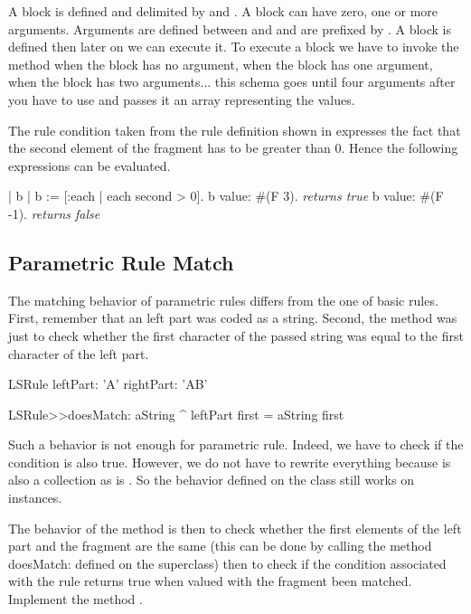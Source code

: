 A block is defined and delimited by \ct{[} and \ct{]}. A block can
have zero, one or more arguments. Arguments are defined between \ct{[}
and \ct{|} and are prefixed by \ct{:}. A block is defined then later
on we can execute it. To execute a block we have to invoke the method
 when the block has no argument,  when the block
has one argument,  when the block has two
arguments...  this schema goes until four arguments after you have to
use  and passes it an array representing the
values.

The rule condition  taken from the rule
definition shown in  expresses the fact that the 
second element of the fragment has to be greater than 0. Hence the following expressions can be evaluated.

\begin{scriptwithouttitle}
| b |
b := [:each | each second > 0].
b value: #(F 3).
\emph{returns true}
b value: #(F -1).
\emph{returns false}
\end{scriptwithouttitle}





\subsection{Parametric Rule Match}
The matching behavior of parametric rules differs from the one of
basic rules.  First, remember that an  left part was coded
as a string. Second, the method  was just to
check whether the first character of the passed string was equal to
the first character of the left part.

\begin{scriptwithouttitle}
LSRule leftPart: 'A' rightPart: 'AB'
\end{scriptwithouttitle}

\begin{method}
LSRule>>doesMatch: aString
    ^ leftPart first = aString first
\end{method}

Such a behavior is not enough for parametric rule. Indeed, we have to
check if the condition is also true. However, we do not have to
rewrite everything because  is also a collection as is
. So the behavior defined on the class  still works
on  instances. 

The behavior of the method  is then
to check whether the first elements of the left part and the fragment
are the same (this can be done by calling the method doesMatch:
defined on the superclass) then to check if the condition associated
with the rule returns true when valued with the fragment been matched.
Implement the method .


